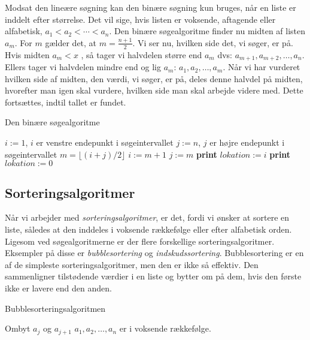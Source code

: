 Modsat den lineære søgning kan den binære søgning kun bruges, når en liste er inddelt efter størrelse. Det vil sige, hvis listen er voksende, aftagende eller alfabetisk, $a_{1}<a_{2}<\dotsb<a_{n}$. Den binære søgealgoritme finder nu midten af listen $a_{m}$. For $m$ gælder det, at $m=\frac{n+1}{2}$. Vi ser nu, hvilken side det, vi søger, er på. Hvis midten $a_{m}<x$ , så tager vi halvdelen større end $a_{m}$ dvs: $a_{m+1}, a_{m+2},\dotsc,a_{n}$. Ellers tager vi halvdelen mindre end og lig $a_{m}$: $a_{1}, a_{2},\dotsc,a_{m}$. Når vi har vurderet hvilken side af midten, den værdi, vi søger, er på, deles denne halvdel på midten, hvorefter man igen skal vurdere, hvilken side man skal arbejde videre med. Dette fortsættes, indtil tallet er fundet. 

\begin{algorithm}[H]
\caption{Den binære søgealgoritme}
\begin{algorithmic}[1]

    \State $i:=1$, {$i$ er venstre endepunkt i søgeintervallet}
    \State $j:=n$, {$j$ er højre endepunkt i søgeintervallet}
        \State $m=\lfloor (i+j)/2 \rfloor$
    		\State $i:=m+1$
    		\Else
    		\State $j:=m$
    		\EndIf
    \State \textbf{print} $lokation:=i$
    \Else
    \State \textbf{print} $lokation:=0$
    \EndIf
    \EndWhile  \label{roy's loop}
\EndProcedure

\end{algorithmic}
\end{algorithm}

\subsection{Sorteringsalgoritmer}
Når vi arbejder med \emph{sorteringsalgoritmer}, er det, fordi vi ønsker at sortere en liste, således at den inddeles i voksende rækkefølge eller efter alfabetisk orden. Ligesom ved søgealgoritmerne er der flere forskellige sorteringsalgoritmer. Eksempler på disse er \emph{bubblesortering} og \emph{indskudssortering}. Bubblesortering er en af de simpleste sorteringsalgoritmer, men den er ikke så effektiv. Den sammenligner tilstødende værdier i en liste og bytter om på dem, hvis den første ikke er lavere end den anden.

\begin{algorithm}[H]
\caption{Bubblesorteringsalgoritmen}
\begin{algorithmic}[1]

\EndProcedure
{}
    			\State Ombyt $a_{j}$ og $a_{j+1}$ 	
\EndIf
\EndFor
\EndFor
\State $a_{1},a_{2},\dotsc,a_{n}$ er i voksende rækkefølge. 

\end{algorithmic}
\end{algorithm}

